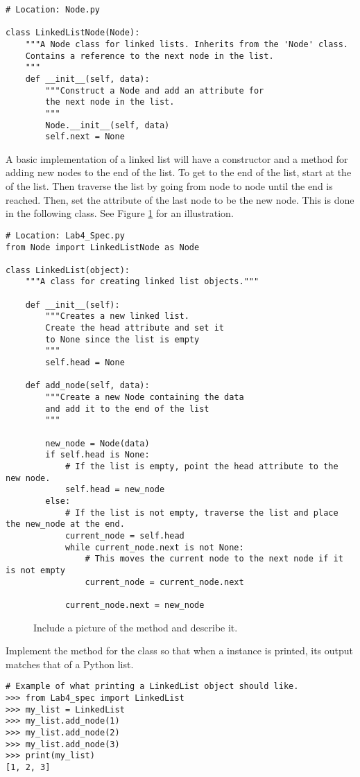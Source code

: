 \begin{lstlisting}
# Location: Node.py

class LinkedListNode(Node):
	"""A Node class for linked lists. Inherits from the 'Node' class.
	Contains a reference to the next node in the list.
	"""
	def __init__(self, data):
		"""Construct a Node and add an attribute for
		the next node in the list.
		"""
		Node.__init__(self, data)
		self.next = None
\end{lstlisting}

A basic implementation of a linked list will have a constructor and a method for adding new nodes to the end of the list.
To get to the end of the list, start at the  of the list.
Then traverse the list by going from node to node until the end is reached.
Then, set the  attribute of the last node to be the new node.
This is done in the following class.
See Figure \ref{fig:add_node} for an illustration.

\begin{lstlisting}
# Location: Lab4_Spec.py
from Node import LinkedListNode as Node

class LinkedList(object):
	"""A class for creating linked list objects."""

	def __init__(self):
		"""Creates a new linked list.
		Create the head attribute and set it 
		to None since the list is empty
		"""
		self.head = None

	def add_node(self, data):
		"""Create a new Node containing the data 
		and add it to the end of the list
		"""

		new_node = Node(data)
		if self.head is None:
			# If the list is empty, point the head attribute to the new node.
			self.head = new_node
		else:
			# If the list is not empty, traverse the list and place the new_node at the end.
			current_node = self.head
			while current_node.next is not None:
				# This moves the current node to the next node if it is not empty
				current_node = current_node.next

			current_node.next = new_node
\end{lstlisting}

\begin{figure}
\centering
\caption{Include a picture of the  method and describe it.}
\label{fig:add_node}
\end{figure}

\begin{problem}
Implement the  method for the  class so that when a  instance is printed, its output matches that of a Python list.
\begin{lstlisting}
# Example of what printing a LinkedList object should like.
>>> from Lab4_spec import LinkedList
>>> my_list = LinkedList
>>> my_list.add_node(1)
>>> my_list.add_node(2)
>>> my_list.add_node(3)
>>> print(my_list)
[1, 2, 3]
\end{lstlisting}
\end{problem}

